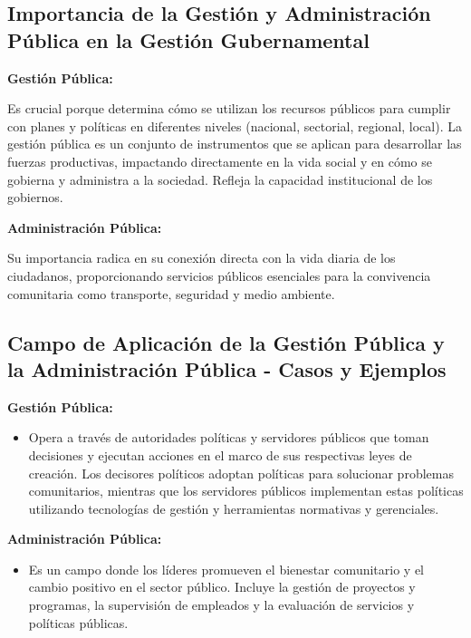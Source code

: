 \documentclass[
  jou,
  floatsintext,
  longtable,
  a4paper,
  nolmodern,
  notxfonts,
  notimes,
  12pt,
  colorlinks=true,linkcolor=blue,citecolor=blue,urlcolor=blue]{apa7}
\providecommand{\tightlist}{%
  \setlength{\itemsep}{0pt}\setlength{\parskip}{0pt}}
\begin{document}
\subsection{Importancia de la Gestión y Administración Pública en la
Gestión
Gubernamental}\label{importancia-de-la-gestiuxf3n-y-administraciuxf3n-puxfablica-en-la-gestiuxf3n-gubernamental}

\textbf{Gestión Pública:}

Es crucial porque determina cómo se utilizan los recursos públicos para
cumplir con planes y políticas en diferentes niveles (nacional,
sectorial, regional, local). La gestión pública es un conjunto de
instrumentos que se aplican para desarrollar las fuerzas productivas,
impactando directamente en la vida social y en cómo se gobierna y
administra a la sociedad. Refleja la capacidad institucional de los
gobiernos.

\textbf{Administración Pública:}

Su importancia radica en su conexión directa con la vida diaria de los
ciudadanos, proporcionando servicios públicos esenciales para la
convivencia comunitaria como transporte, seguridad y medio ambiente.

\subsection{Campo de Aplicación de la Gestión Pública y la
Administración Pública - Casos y
Ejemplos}\label{campo-de-aplicaciuxf3n-de-la-gestiuxf3n-puxfablica-y-la-administraciuxf3n-puxfablica---casos-y-ejemplos}

\textbf{Gestión Pública:}

\begin{itemize}
\tightlist
\item
  Opera a través de autoridades políticas y servidores públicos que
  toman decisiones y ejecutan acciones en el marco de sus respectivas
  leyes de creación. Los decisores políticos adoptan políticas para
  solucionar problemas comunitarios, mientras que los servidores
  públicos implementan estas políticas utilizando tecnologías de gestión
  y herramientas normativas y gerenciales.
\end{itemize}

\textbf{Administración Pública:}

\begin{itemize}
\tightlist
\item
  Es un campo donde los líderes promueven el bienestar comunitario y el
  cambio positivo en el sector público. Incluye la gestión de proyectos
  y programas, la supervisión de empleados y la evaluación de servicios
  y políticas públicas.
\end{itemize}
\end{document}
